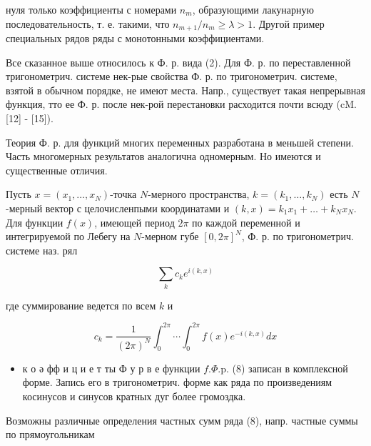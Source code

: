 \documentclass[10pt]{article}
\begin{document}
нуля только коэффициенты с номерами $n_{m}$, образующими лакунарную последовательность, т. е. такими, что $n_{m+1} / n_{m} \geqslant \lambda>1$. Другой пример специальных рядов ряды с монотонными коэффициентами.



Все сказанное выше относилось к Ф. р. вида (2). Для Ф. р. по переставленной тригонометрич. системе нек-рые свойства Ф. р. по тригонометрич. системе, взятой в обычном порядке, не имеют места. Напр., существует такая непрерывная функция, тто ее Ф. р. после нек-рой перестановки расходится почти всюду (cM. [12] - [15]).



Теория Ф. р. для функций многих переменных разработана в меньшей степени. Часть многомерных результатов аналогична одномерным. Но имеются и существенные отличия.



Пусть $x=\left(x_{1}, \ldots, x_{N}\right)$-точка $N$-мерного пространства, $k=\left(k_{1}, \ldots, k_{N}\right)$ есть $N$-мерный вектор с целочисленпыми координатами и $(k, x)=k_{1} x_{1}+\ldots+k_{N} x_{N}$. Для функции $f(x)$, имеющей период $2 \pi$ по каждой переменной и интегрируемой по Лебегу на $N$-мерном губе $[0,2 \pi]^{N}$, Ф. р. по тригонометрич. системе наз. рял



\[

\sum_{k} c_{k} e^{i(k, x)}

\]



где суммирование ведется по всем $k$ и



\[

c_{k}=\frac{1}{(2 \pi)^{N}} \int_{0}^{2 \pi} \cdots \int_{0}^{2 \pi} f(x) e^{-i(k, x)} d x

\]



\begin{itemize}

  \item к о ә фф и ц и е т ты Ф у р в е функции $f . \Phi . \mathrm{p}$. (8) записан в комплексной форме. Запись его в тригонометрич. форме как ряда по произведениям косинусов и синусов кратных дуг более громоздка.

\end{itemize}



Возможны различные определения частных сумм ряда (8), напр. частные суммы по прямоугольникам
\end{document}
